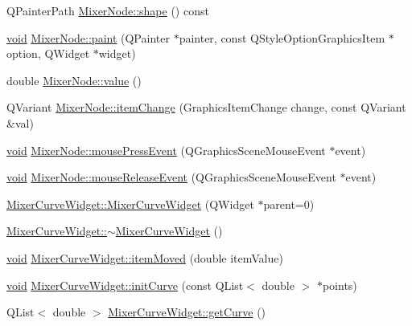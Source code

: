 \begin{DoxyCompactItemize}
\item 
\-Q\-Painter\-Path \hyperlink{group___u_a_v_object_widget_utils_gafbd32275c2089c42d00f43a0e17886ae}{\-Mixer\-Node\-::shape} () const 
\item 
\hyperlink{group___u_a_v_objects_plugin_ga444cf2ff3f0ecbe028adce838d373f5c}{void} \hyperlink{group___u_a_v_object_widget_utils_gaa06d538612911f733082849ebbef3cb0}{\-Mixer\-Node\-::paint} (\-Q\-Painter $\ast$painter, const \-Q\-Style\-Option\-Graphics\-Item $\ast$option, \-Q\-Widget $\ast$widget)
\item 
double \hyperlink{group___u_a_v_object_widget_utils_ga74c57bb80930c775e055d2759acb92fe}{\-Mixer\-Node\-::value} ()
\item 
\-Q\-Variant \hyperlink{group___u_a_v_object_widget_utils_ga4e95b04348d98dedd3493d466fb5bdf5}{\-Mixer\-Node\-::item\-Change} (\-Graphics\-Item\-Change change, const \-Q\-Variant \&val)
\item 
\hyperlink{group___u_a_v_objects_plugin_ga444cf2ff3f0ecbe028adce838d373f5c}{void} \hyperlink{group___u_a_v_object_widget_utils_ga5b8710657e58b224928419c431d19fbc}{\-Mixer\-Node\-::mouse\-Press\-Event} (\-Q\-Graphics\-Scene\-Mouse\-Event $\ast$event)
\item 
\hyperlink{group___u_a_v_objects_plugin_ga444cf2ff3f0ecbe028adce838d373f5c}{void} \hyperlink{group___u_a_v_object_widget_utils_ga82dc38bf127547b87931a58561f02a27}{\-Mixer\-Node\-::mouse\-Release\-Event} (\-Q\-Graphics\-Scene\-Mouse\-Event $\ast$event)
\item 
\hyperlink{group___u_a_v_object_widget_utils_gafcc28d34cf4bf00ed61926b4cbdd5a7e}{\-Mixer\-Curve\-Widget\-::\-Mixer\-Curve\-Widget} (\-Q\-Widget $\ast$parent=0)
\item 
\hyperlink{group___u_a_v_object_widget_utils_ga95ab335915408821a081b9be9b837866}{\-Mixer\-Curve\-Widget\-::$\sim$\-Mixer\-Curve\-Widget} ()
\item 
\hyperlink{group___u_a_v_objects_plugin_ga444cf2ff3f0ecbe028adce838d373f5c}{void} \hyperlink{group___u_a_v_object_widget_utils_ga1a7a9e06137eef080091ca11b1bf0c05}{\-Mixer\-Curve\-Widget\-::item\-Moved} (double item\-Value)
\item 
\hyperlink{group___u_a_v_objects_plugin_ga444cf2ff3f0ecbe028adce838d373f5c}{void} \hyperlink{group___u_a_v_object_widget_utils_gaa776ac520f82de83862c18af0ff99ce3}{\-Mixer\-Curve\-Widget\-::init\-Curve} (const \-Q\-List$<$ double $>$ $\ast$points)
\item 
\-Q\-List$<$ double $>$ \hyperlink{group___u_a_v_object_widget_utils_gad97c9f7b189fc9097da50ab5b8f08f4d}{\-Mixer\-Curve\-Widget\-::get\-Curve} ()

\end{DoxyCompactItemize}
